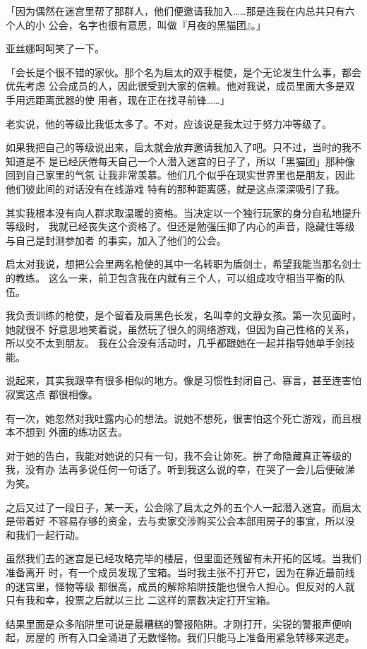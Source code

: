 \documentclass[11pt]{book}
\begin{document}
「因为偶然在迷宫里帮了那群人，他们便邀请我加入……那是连我在内总共只有六个人的小
公会，名字也很有意思，叫做『月夜的黑猫团』。」

亚丝娜呵呵笑了一下。

「会长是个很不错的家伙。那个名为启太的双手棍使，是个无论发生什么事，都会优先考虑
公会成员的人，因此很受到大家的信赖。他对我说，成员里面大多是双手用远距离武器的使
用者，现在正在找寻前锋……」

老实说，他的等级比我低太多了。不对，应该说是我太过于努力冲等级了。

如果我把自己的等级说出来，启太就会放弃邀请我加入了吧。只不过，当时的我不知道是不
是已经厌倦每天自己一个人潜入迷宫的日子了，所以「黑猫团」那种像回到自己家里的气氛
让我非常羡慕。他们几个似乎在现实世界里也是朋友，因此他们彼此间的对话没有在线游戏
特有的那种距离感，就是这点深深吸引了我。

其实我根本没有向人群求取温暖的资格。当决定以一个独行玩家的身分自私地提升等级时，
我就已经丧失这个资格了。但还是勉强压抑了内心的声音，隐藏住等级与自己是封测参加者
的事实，加入了他们的公会。

启太对我说，想把公会里两名枪使的其中一名转职为盾剑士，希望我能当那名剑士的教练。
这么一来，前卫包含我在内就有三个人，可以组成攻守相当平衡的队伍。

我负责训练的枪使，是个留着及肩黑色长发，名叫幸的文静女孩。第一次见面时，她就很不
好意思地笑着说，虽然玩了很久的网络游戏，但因为自己性格的关系，所以交不太到朋友。
我在公会没有活动时，几乎都跟她在一起并指导她单手剑技能。

说起来，其实我跟幸有很多相似的地方。像是习惯性封闭自己、寡言，甚至连害怕寂寞这点
都很相像。

有一次，她忽然对我吐露内心的想法。说她不想死，很害怕这个死亡游戏，而且根本不想到
外面的练功区去。

对于她的告白，我能对她说的只有一句，我不会让妳死。拚了命隐藏真正等级的我，没有办
法再多说任何一句话了。听到我这么说的幸，在哭了一会儿后便破涕为笑。

之后又过了一段日子，某一天，公会除了启太之外的五个人一起潜入迷宫。而启太是带着好
不容易存够的资金，去与卖家交涉购买公会本部用房子的事宜，所以没和我们一起行动。

虽然我们去的迷宫是已经攻略完毕的楼层，但里面还残留有未开拓的区域。当我们准备离开
时，有一个成员发现了宝箱。当时我主张不打开它，因为在靠近最前线的迷宫里，怪物等级
都很高，成员的解除陷阱技能也很令人担心。但反对的人就只有我和幸，投票之后就以三比
二这样的票数决定打开宝箱。

结果里面是众多陷阱里可说是最糟糕的警报陷阱。才刚打开，尖锐的警报声便响起，房屋的
所有入口全涌进了无数怪物。我们只能马上准备用紧急转移来逃走。
\end{document}
